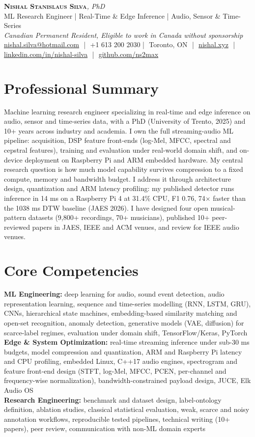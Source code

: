 \documentclass[11pt]{article}
\makeatletter
\newcommand{\cvName}{Nishal Stanislaus Silva}
\newcommand{\cvEmail}{nishal.silva@hotmail.com}
\newcommand{\cvPhone}{+1 613 200 2030}
\newcommand{\cvCity}{Toronto, ON}
\newcommand{\cvSite}{https://nishal.xyz}
\newcommand{\cvLinkedIn}{https://www.linkedin.com/in/nishal-silva}
\newcommand{\cvGitHub}{https://github.com/ns2max}
\newcommand{\cvStatus}{Canadian Permanent Resident, Eligible to work in Canada without sponsorship}
\newcommand{\cvTagline}{ML Research Engineer | Real-Time \& Edge Inference | Audio, Sensor \& Time-Series}
\makeatother
\begin{document}
\pagestyle{empty}
\begin{center}
    {\LARGE \scshape \textbf{\cvName}}{\large \textit{, PhD}}\\[1pt]
    {\small \cvTagline}\\[1pt]
    {\footnotesize\textit{\cvStatus}}\\[1pt]
    {\small
    \href{mailto:\cvEmail}{\cvEmail} \,\,|\,\, \cvPhone \,\,|\,\, \cvCity
    \,\,|\,\, \href{\cvSite}{nishal.xyz} \,\,|\,\, \href{\cvLinkedIn}{linkedin.com/in/nishal-silva}
    \,\,|\,\, \href{\cvGitHub}{github.com/ns2max}}
\end{center}

\section*{Professional Summary}

Machine learning research engineer specializing in real-time and edge inference on audio, sensor and time-series data, with a PhD (University of Trento, 2025) and 10+ years across industry and academia. I own the full streaming-audio ML pipeline: acquisition, DSP feature front-ends (log-Mel, MFCC, spectral and cepstral features), training and evaluation under real-world domain shift, and on-device deployment on Raspberry Pi and ARM embedded hardware. My central research question is how much model capability survives compression to a fixed compute, memory and bandwidth budget. I address it through architecture design, quantization and ARM latency profiling: my published detector runs inference in 14 ms on a Raspberry Pi 4 at 31.4\% CPU, F1 0.76, 74$\times$ faster than the 1038 ms DTW baseline (JAES 2026). I have designed four open musical-pattern datasets (9,800+ recordings, 70+ musicians), published 10+ peer-reviewed papers in JAES, IEEE and ACM venues, and review for IEEE audio venues.

\section*{Core Competencies}

\textbf{ML Engineering:} deep learning for audio, sound event detection, audio representation learning, sequence and time-series modelling (RNN, LSTM, GRU), CNNs, hierarchical state machines, embedding-based similarity matching and open-set recognition, anomaly detection, generative models (VAE, diffusion) for scarce-label regimes, evaluation under domain shift, TensorFlow/Keras, PyTorch\\
\textbf{Edge \& System Optimization:} real-time streaming inference under sub-30 ms budgets, model compression and quantization, ARM and Raspberry Pi latency and CPU profiling, embedded Linux, C++17 audio engines, spectrogram and feature front-end design (STFT, log-Mel, MFCC, PCEN, per-channel and frequency-wise normalization), bandwidth-constrained payload design, JUCE, Elk Audio OS\\
\textbf{Research Engineering:} benchmark and dataset design, label-ontology definition, ablation studies, classical statistical evaluation, weak, scarce and noisy annotation workflows, reproducible tested pipelines, technical writing (10+ papers), peer review, communication with non-ML domain experts
\end{document}
